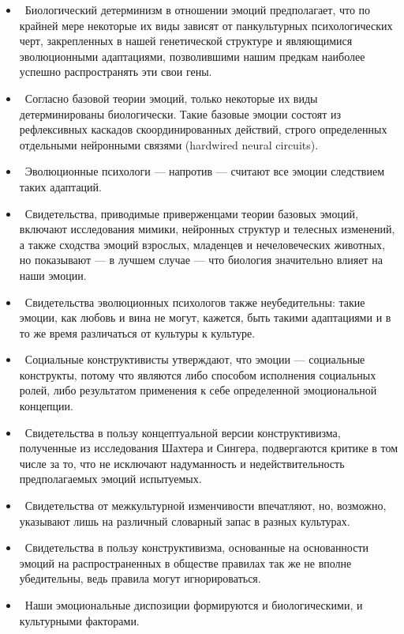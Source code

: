 \documentclass[11pt]{book}
\begin{document}
\begin{itemize}
  \item\ Биологический детерминизм в отношении эмоций предполагает, что по крайней мере некоторые их виды зависят от панкультурных психологических черт, закрепленных в нашей генетической структуре и являющимися эволюционными адаптациями, позволившими нашим предкам наиболее успешно распространять эти свои гены.
  \item\ Согласно базовой теории эмоций, только некоторые их виды детерминированы биологически. Такие базовые эмоции состоят из рефлексивных каскадов скоординированных действий, строго определенных отдельными нейронными связями (hardwired neural circuits).
  \item\ Эволюционные психологи --- напротив --- считают все эмоции следствием таких адаптаций.
  \item\ Свидетельства, приводимые приверженцами теории базовых эмоций, включают исследования мимики, нейронных структур и телесных изменений, а также сходства эмоций взрослых, младенцев и нечеловеческих животных, но показывают --- в лучшем случае --- что биология значительно влияет на наши эмоции.
  \item\ Свидетельства эволюционных психологов также неубедительны: такие эмоции, как любовь и вина не могут, кажется, быть такими адаптациями и в то же время различаться от культуры к культуре.
  \item\ Социальные конструктивисты утверждают, что эмоции --- социальные конструкты, потому что являются либо способом исполнения социальных ролей, либо результатом применения к себе определенной эмоциональной концепции.
  \item\ Свидетельства в пользу концептуальной версии конструктивизма, полученные из исследования Шахтера и Сингера, подвергаются критике в том числе за то, что не исключают надуманность и недействительность предполагаемых эмоций испытуемых.
  \item\ Свидетельства от межкультурной изменчивости впечатляют, но, возможно, указывают лишь на различный словарный запас в разных культурах.
  \item\ Свидетельства в пользу конструктивизма, основанные на основанности эмоций на распространенных в обществе правилах так же не вполне убедительны, ведь правила могут игнорироваться.
  \item\ Наши эмоциональные диспозиции формируются и биологическими, и культурными факторами.
\end{itemize}
\end{document}
